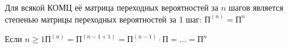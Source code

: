 \begin{sledsv}
  Для всякой КОМЦ её матрица переходных вероятностей за $n$ шагов является степенью матрицы переходных
  вероятностей за 1 шаг: $\text{П}^{(n)} = \text{П}^n$
  \begin{dokvo}
    Если $n \geqslant 1 \text{П}^{(n)} = \text{П}^{(n-1+1)} = \text{П}^{(n-1)}\cdot\text{П} = \ldots = \text{П}^n$
  \end{dokvo}
\end{sledsv}
